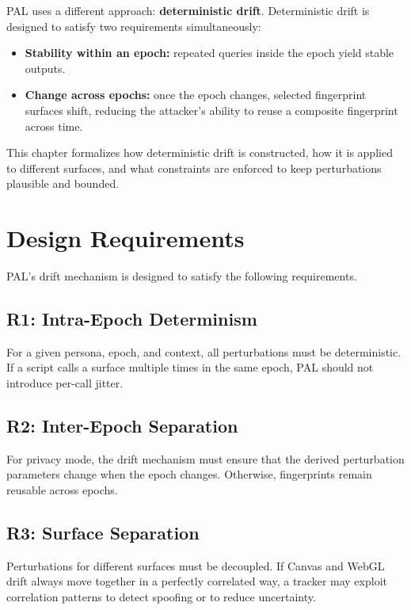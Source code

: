 \documentclass[11pt]{report}
\begin{document}
PAL uses a different approach: \textbf{deterministic drift}. Deterministic drift is designed to satisfy two requirements simultaneously:

\begin{itemize}
    \item \textbf{Stability within an epoch:} repeated queries inside the epoch yield stable outputs.
    \item \textbf{Change across epochs:} once the epoch changes, selected fingerprint surfaces shift, reducing the attacker’s ability to reuse a composite fingerprint across time.
\end{itemize}

This chapter formalizes how deterministic drift is constructed, how it is applied to different surfaces, and what constraints are enforced to keep perturbations plausible and bounded.

\section{Design Requirements}

PAL’s drift mechanism is designed to satisfy the following requirements.

\subsection{R1: Intra-Epoch Determinism}

For a given persona, epoch, and context, all perturbations must be deterministic. If a script calls a surface multiple times in the same epoch, PAL should not introduce per-call jitter.

\subsection{R2: Inter-Epoch Separation}

For privacy mode, the drift mechanism must ensure that the derived perturbation parameters change when the epoch changes. Otherwise, fingerprints remain reusable across epochs.

\subsection{R3: Surface Separation}

Perturbations for different surfaces must be decoupled. If Canvas and WebGL drift always move together in a perfectly correlated way, a tracker may exploit correlation patterns to detect spoofing or to reduce uncertainty.
\end{document}
